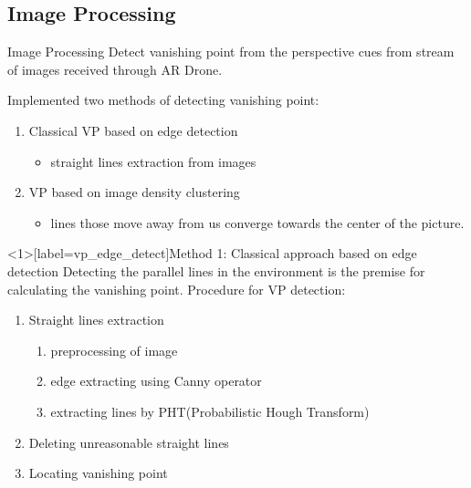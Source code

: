\documentclass[8pt]{beamer}
\begin{document}
\subsection{Image Processing}
\begin{frame}{Image Processing}
Detect vanishing point from the perspective cues from stream of images received through AR Drone.

\vspace{0.5cm}
Implemented two methods of detecting vanishing point:\vspace{0.3cm}
\begin{enumerate}
  \setlength\itemsep{1em}
  \item Classical VP based on edge detection
    \begin{itemize}
     \item straight lines extraction from images
    \end{itemize}
  \item VP based on image density clustering
    \begin{itemize}
     \item lines those move away from us converge towards the center of the picture.
    \end{itemize}
\end{enumerate}

\end{frame}

\begin{frame}<1>[label=vp_edge_detect]{Method 1: Classical approach based on edge detection}
Detecting the parallel lines in the environment is the premise for calculating the vanishing point.
\vspace{0.3cm}
Procedure for VP detection:
\begin{enumerate}
  \setlength\itemsep{1em}
  \item \alert<2>{Straight lines extraction}
  \begin{enumerate}
    \setlength\itemsep{1em}
    \item \alert<2>{preprocessing of image}
    \item {}\alert<3>{edge extracting using Canny operator}
    \item {}\alert<4>{extracting lines by PHT(Probabilistic Hough Transform)}
  \end{enumerate}
 \item {}\alert<5>{Deleting unreasonable straight lines}
 \item {}\alert<6>{Locating vanishing point}
\end{enumerate}

\end{frame}
\end{document}
